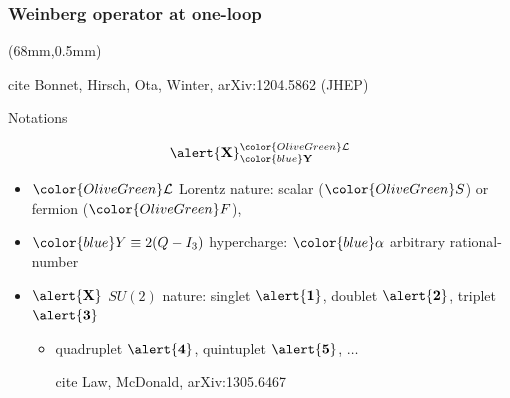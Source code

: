 \documentclass[%
xcolor=dvipsnames,table%
]{beamer}
\begin{document}
\begin{frame}
  \frametitle{Weinberg operator at one-loop}
\begin{textblock*}{297mm}(68mm,0.5mm)%
\begin{beamercolorbox}[sep=0.01em,wd=5.7cm,center,rounded=true,shadow=true]{cite}
\scriptsize Bonnet, Hirsch, Ota, Winter, arXiv:1204.5862 (JHEP)
\end{beamercolorbox}
\end{textblock*}

  \begin{block}{Notations}
    \begin{center}
      \begin{align*}
        \alert{\mathbf{X}}^{\color{OliveGreen}\mathcal{L}}_{\color{blue}\mathbf{Y}}
      \end{align*}
      \begin{itemize}
      \item $\color{OliveGreen}\mathcal{L}$ Lorentz nature: scalar ($\color{OliveGreen}S$) or fermion ($\color{OliveGreen}F$),
      \item $\color{blue}Y\equiv 2(Q-I_3)$ hypercharge: $\color{blue}\alpha$ arbitrary rational-number
      \item $\alert{\mathbf{X}}$ $SU(2)$ nature: singlet $\alert{\mathbf{1}}$, doublet $\alert{\mathbf{2}}$, triplet $\alert{\mathbf{3}}$
        \begin{itemize}
        \item quadruplet $\alert{\mathbf{4}}$, quintuplet $\alert{\mathbf{5}}$, $\ldots$ \begin{beamercolorbox}[sep=0.01em,wd=5.7cm,center,rounded=true,shadow=true]{cite}
\scriptsize Law, McDonald, arXiv:1305.6467
\end{beamercolorbox}

        \end{itemize}

      \end{itemize}
    \end{center}
  \end{block}
\end{frame}
\end{document}
